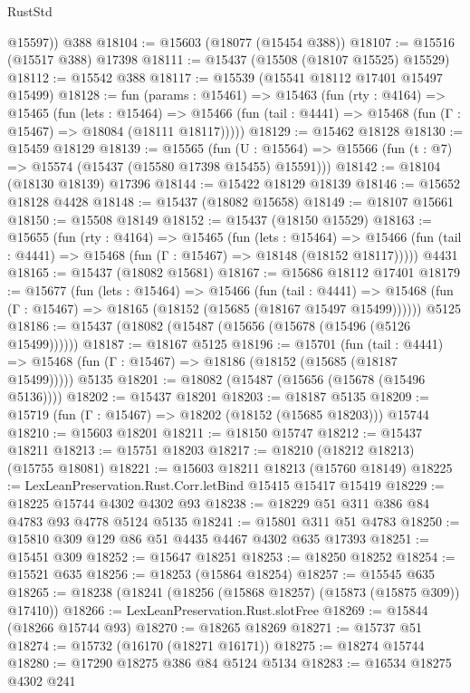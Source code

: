 \begin{lexlean}{RustStd}
\begin{coremodule}
        @15597))
    @388
@18104 := @15603 (@18077 (@15454 @388))
@18107 := @15516 (@15517 @388) @17398
@18111 := @15437 (@15508 (@18107 @15525) @15529)
@18112 := @15542 @388
@18117 := @15539 (@15541 @18112 @17401 @15497 @15499)
@18128 := fun (params : @15461) =>
  @15463
    (fun (rty : @4164) =>
    @15465
      (fun (lets : @15464) =>
      @15466 (fun (tail : @4441) => @15468 (fun (Γ : @15467) => @18084 (@18111 @18117)))))
@18129 := @15462 @18128
@18130 := @15459 @18129
@18139 := @15565
    (fun (U : @15564) => @15566 (fun (t : @7) => @15574 (@15437 (@15580 @17398 @15455) @15591)))
@18142 := @18104 (@18130 @18139) @17396
@18144 := @15422 @18129 @18139
@18146 := @15652 @18128 @4428
@18148 := @15437 (@18082 @15658)
@18149 := @18107 @15661
@18150 := @15508 @18149
@18152 := @15437 (@18150 @15529)
@18163 := @15655
    (fun (rty : @4164) =>
    @15465
      (fun (lets : @15464) =>
      @15466 (fun (tail : @4441) => @15468 (fun (Γ : @15467) => @18148 (@18152 @18117)))))
    @4431
@18165 := @15437 (@18082 @15681)
@18167 := @15686 @18112 @17401
@18179 := @15677
    (fun (lets : @15464) =>
    @15466
      (fun (tail : @4441) =>
      @15468 (fun (Γ : @15467) => @18165 (@18152 (@15685 (@18167 @15497 @15499))))))
    @5125
@18186 := @15437 (@18082 (@15487 (@15656 (@15678 (@15496 (@5126 @15499))))))
@18187 := @18167 @5125
@18196 := @15701
    (fun (tail : @4441) => @15468 (fun (Γ : @15467) => @18186 (@18152 (@15685 (@18187 @15499)))))
    @5135
@18201 := @18082 (@15487 (@15656 (@15678 (@15496 @5136))))
@18202 := @15437 @18201
@18203 := @18187 @5135
@18209 := @15719 (fun (Γ : @15467) => @18202 (@18152 (@15685 @18203))) @15744
@18210 := @15603 @18201
@18211 := @18150 @15747
@18212 := @15437 @18211
@18213 := @15751 @18203
@18217 := @18210 (@18212 @18213) (@15755 @18081)
@18221 := @15603 @18211 @18213 (@15760 @18149)
@18225 := LexLeanPreservation.Rust.Corr.letBind @15415 @15417 @15419
@18229 := @18225 @15744 @4302 @4302 @93
@18238 := @18229 @51 @311 @386 @84 @4783 @93 @4778 @5124 @5135
@18241 := @15801 @311 @51 @4783
@18250 := @15810 @309 @129 @86 @51 @4435 @4467 @4302 @635 @17393
@18251 := @15451 @309
@18252 := @15647 @18251
@18253 := @18250 @18252
@18254 := @15521 @635
@18256 := @18253 (@15864 @18254)
@18257 := @15545 @635
@18265 := @18238 (@18241 (@18256 (@15868 @18257) (@15873 (@15875 @309)) @17410))
@18266 := LexLeanPreservation.Rust.slotFree
@18269 := @15844 (@18266 @15744 @93)
@18270 := @18265 @18269
@18271 := @15737 @51
@18274 := @15732 (@16170 (@18271 @16171))
@18275 := @18274 @15744
@18280 := @17290 @18275 @386 @84 @5124 @5134
@18283 := @16534 @18275 @4302 @241

\end{coremodule}
\end{lexlean}
